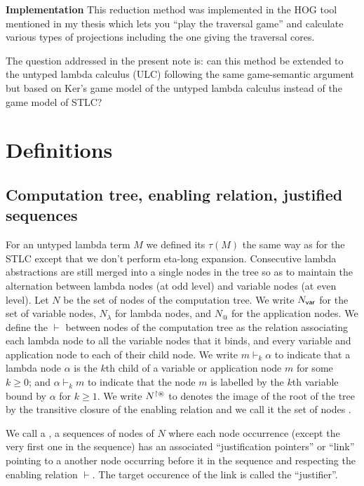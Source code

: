 \documentclass{article}
\theoremstyle{definition}
\newcommand\Nodes{N}%
\newcommand\NodesVar{N_{\sf var}}%
\newcommand\NodesLmd{N_\lambda}%
\newcommand{\NodeHjByRoot}{\Nodes^{\filter\theroot}}
\newcommand{\enables}{\vdash}
\begin{document}
\textbf{Implementation}
This reduction method was implemented in the HOG tool mentioned in my thesis which lets you ``play the traversal game'' and calculate various types of projections including the one giving the traversal cores.

The question addressed in the present note is: can this method be extended to the untyped lambda calculus (ULC) following the same game-semantic argument but based on Ker's game model of the untyped lambda calculus instead of the game model of STLC?


\section{Definitions}

\subsection{Computation tree, enabling relation, justified sequences}

For an untyped lambda term $M$ we defined its  $\tau(M)$ the same way as for the STLC
except that we don't perform eta-long expansion. Consecutive lambda abstractions are still merged into a single nodes in the tree so as to maintain the alternation between lambda nodes (at odd level) and variable nodes (at even level).
Let $\Nodes$ be the set of nodes of the computation tree. We write $\NodesVar$ for the set of variable nodes, $\NodesLmd$ for lambda nodes, and $\Nodes_{@}$ for the application nodes.
We define the  $\enables$ between nodes of the computation tree as the relation associating each lambda node to all the variable nodes that it binds, and every variable and application node to each of their child node. We write $m \enables_k \alpha$ to indicate that a lambda node $\alpha$ is the $k$th child of a variable or application node $m$ for some $k\geq0$; and $\alpha \enables_k m$ to indicate that the node $m$ is labelled by the $k$th variable bound by $\alpha$ for $k\geq1$. We write $\NodeHjByRoot$ to denotes the image of the root of the tree by the transitive closure of the enabling relation and we call it the set of nodes .

We call a , a sequences of nodes of $\Nodes$ where each node occurrence (except the very first one in the sequence) has an associated ``justification pointers'' or ``link'' pointing to a another node occurring before it in the sequence and respecting the enabling relation $\enables$. The target occurence of the link is called the ``justifier''.
\end{document}
